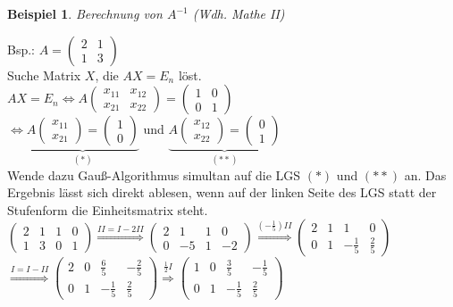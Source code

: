 \documentclass[a4paper,11pt]{article}
\newtheorem{bsp}[definition]{Beispiel}
\begin{document}
\begin{bsp}
	Berechnung von $A^{-1}$ (Wdh. Mathe II)
\end{bsp}
Bsp.: $A=\begin{pmatrix}2&1\\1&3\end{pmatrix}$ \\
Suche Matrix $X$, die $AX=E_n$ löst. \\
$AX=E_n\Leftrightarrow A\begin{pmatrix}x_{11} & x_{12} \\ x_{21} & x_{22}\end{pmatrix}=\begin{pmatrix}1&0\\0&1\end{pmatrix}$ \\
$\Leftrightarrow\underbrace{A\begin{pmatrix}x_{11}\\x_{21}\end{pmatrix}=\begin{pmatrix}1\\0\end{pmatrix}}_{(*)}$ und $\underbrace{A\begin{pmatrix}x_{12}\\x_{22}\end{pmatrix}=\begin{pmatrix}0\\1\end{pmatrix}}_{(**)}$ \\
Wende dazu Gauß-Algorithmus simultan auf die LGS $(*)$ und $(**)$ an. Das Ergebnis lässt sich direkt ablesen, wenn auf der linken Seite des LGS statt der Stufenform die Einheitsmatrix steht. \\
$\left(\begin{array}{cc|cc}2 & 1 & 1 & 0 \\ 1 & 3 & 0 & 1\end{array}\right)\overset{II=I-2II}{\Rightarrow}\left(\begin{array}{cc|cc}2 & 1 & 1 & 0 \\ 0 & -5 & 1 & -2\end{array}\right)\overset{(-\frac{1}{5})II}{\Rightarrow}\left(\begin{array}{cc|cc}2 & 1 & 1 & 0 \\ 0 & 1 & -\frac{1}{5} & \frac{2}{5}\end{array}\right)$ \\
$\overset{I=I-II}{\Rightarrow}\left(\begin{array}{cc|cc}2 & 0 & \frac{6}{5} & -\frac{2}{5} \\ 0 & 1 & -\frac{1}{5} & \frac{2}{5}\end{array}\right)\overset{\frac{1}{2}I}{\Rightarrow}\left(\begin{array}{cc|cc}1 & 0 & \frac{3}{5} & -\frac{1}{5} \\ 0 & 1 & -\frac{1}{5} & \frac{2}{5}\end{array}\right)$ \\
\end{document}
